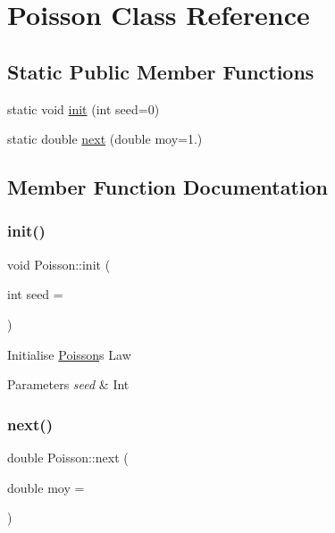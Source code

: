 \hypertarget{classPoisson}{}\section{Poisson Class Reference}
\label{classPoisson}
\subsection*{Static Public Member Functions}
\begin{DoxyCompactItemize}
\item 
static void \hyperlink{classPoisson_ac616eec569fc0291dbd1cacf0f73108e}{init} (int seed=0)
\item 
static double \hyperlink{classPoisson_aaf4f6c620dba71a1e02fdb2a99f1f031}{next} (double moy=1.)
\end{DoxyCompactItemize}


\subsection{Member Function Documentation}
\mbox{\label{classPoisson_ac616eec569fc0291dbd1cacf0f73108e}} 
\subsubsection{\texorpdfstring{init()}{init()}}
{\footnotesize\ttfamily void Poisson\+::init (\begin{DoxyParamCaption}\item[{int}]{seed = {} }\end{DoxyParamCaption})\hspace{0.3cm}{\ttfamily [static]}}

Initialise \hyperlink{classPoisson}{Poisson}\textquotesingle{}s Law 
\begin{DoxyParams}{Parameters}
{\em seed} & Int \\
\hline
\end{DoxyParams}
\mbox{\label{classPoisson_aaf4f6c620dba71a1e02fdb2a99f1f031}} 
\subsubsection{\texorpdfstring{next()}{next()}}
{\footnotesize\ttfamily double Poisson\+::next (\begin{DoxyParamCaption}\item[{double}]{moy = {} }\end{DoxyParamCaption})\hspace{0.3cm}{\ttfamily [static]}}

